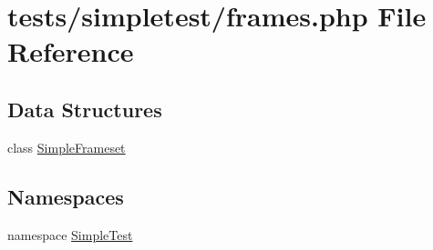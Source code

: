 \hypertarget{frames_8php}{\section{tests/simpletest/frames.php File Reference}
\label{frames_8php}
}
\subsection*{Data Structures}
\begin{DoxyCompactItemize}
\item 
class \hyperlink{class_simple_frameset}{Simple\-Frameset}
\end{DoxyCompactItemize}
\subsection*{Namespaces}
\begin{DoxyCompactItemize}
\item 
namespace \hyperlink{namespace_simple_test}{Simple\-Test}
\end{DoxyCompactItemize}
